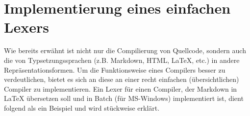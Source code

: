 \documentclass{standalone}
\begin{document}


\chapter{Implementierung eines einfachen Lexers}
Wie bereits erwähnt ist nicht nur die Compilierung von Quellcode, sondern auch die von Typsetzungssprachen (z.B. Markdown, HTML, LaTeX, etc.) in andere Repräsentationsformen. 
Um die Funktionsweise eines Compilers besser zu verdeutlichen, bietet es sich an diese an einer recht einfachen (übersichtlichen) Compiler zu implementieren. Ein Lexer für einen Compiler, der Markdown in LaTeX übersetzen soll und in Batch (für MS-Windows) implementiert ist, dient folgend als ein Beispiel und wird stückweise erklärt.

\end{document}
